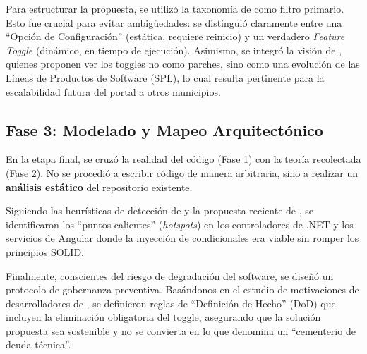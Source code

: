 Para estructurar la propuesta, se utilizó la taxonomía de \cite{torres2020differences} como filtro primario. Esto fue crucial para evitar ambigüedades: se distinguió claramente entre una ``Opción de Configuración'' (estática, requiere reinicio) y un verdadero \textit{Feature Toggle} (dinámico, en tiempo de ejecución). Asimismo, se integró la visión de \cite{dupont2022unifying}, quienes proponen ver los toggles no como parches, sino como una evolución de las Líneas de Productos de Software (SPL), lo cual resulta pertinente para la escalabilidad futura del portal a otros municipios.

\subsection{Fase 3: Modelado y Mapeo Arquitectónico}

En la etapa final, se cruzó la realidad del código (Fase 1) con la teoría recolectada (Fase 2). No se procedió a escribir código de manera arbitraria, sino a realizar un \textbf{análisis estático} del repositorio existente.

Siguiendo las heurísticas de detección de \cite{li2020capture} y la propuesta reciente de \cite{wang2025tsdetector}, se identificaron los ``puntos calientes'' (\textit{hotspots}) en los controladores de .NET y los servicios de Angular donde la inyección de condicionales era viable sin romper los principios SOLID.

Finalmente, conscientes del riesgo de degradación del software, se diseñó un protocolo de gobernanza preventiva. Basándonos en el estudio de motivaciones de desarrolladores de \cite{abdalkareem2021removal}, se definieron reglas de ``Definición de Hecho'' (DoD) que incluyen la eliminación obligatoria del toggle, asegurando que la solución propuesta sea sostenible y no se convierta en lo que \cite{ortiz2021toggledebt} denomina un ``cementerio de deuda técnica''.
